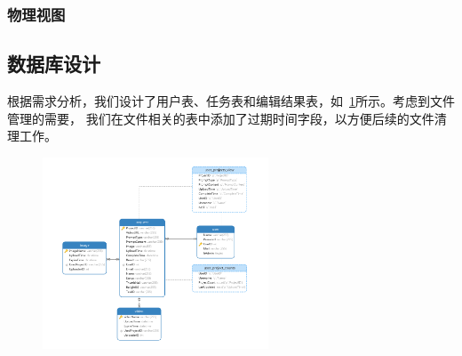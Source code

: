 \subsubsection{物理视图}

\subsection{数据库设计}

根据需求分析，我们设计了用户表、任务表和编辑结果表，如~\ref{fig:database_design}所示。考虑到文件管理的需要，
我们在文件相关的表中添加了过期时间字段，以方便后续的文件清理工作。

\begin{figure}[ht]
    \centering
    \includegraphics[width=0.6\textwidth]{source/img/database_design.png}
    \label{fig:database_design}
\end{figure}
